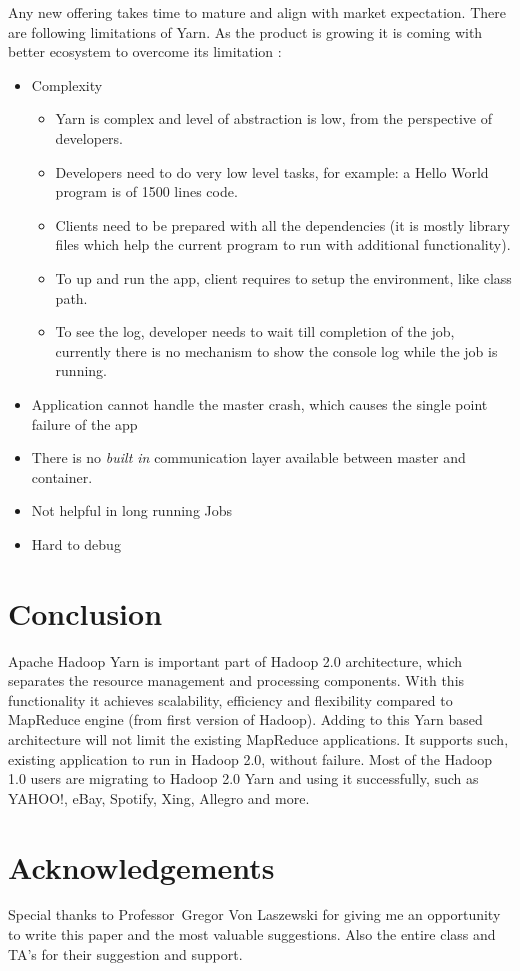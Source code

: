 \documentclass[9pt,twocolumn,twoside]{../../styles/osajnl}
\begin{document}
	Any new offering takes time to mature and align with market expectation. There are following limitations of Yarn. As the product is growing it is coming with better ecosystem to overcome its limitation \cite{www-5}:
\begin{itemize}

	\item Complexity
		\begin{itemize}
			\item Yarn is complex and level of abstraction is low, from the perspective of developers.
			\item Developers need to do very low level tasks, for example:  a Hello World program is of 1500 lines code.
			\item Clients need to be prepared with all the dependencies (it is mostly library files which help the current program to run with additional functionality).
			\item To up and run the app, client requires to setup the environment, like class path.
			\item To see the log, developer needs to wait till completion of the job, currently there is no mechanism to show the console log while the job is running.
		\end{itemize}


	\item Application cannot handle the master crash, which causes the single point failure of the app
	\item There is no \textit{built in} communication layer available between master and container.
	\item Not helpful in long running Jobs
	\item Hard to debug

\end{itemize}

\section{Conclusion}

Apache Hadoop Yarn is important part of Hadoop 2.0 architecture, which separates the resource management and processing components. With this functionality it achieves scalability, efficiency and flexibility compared to MapReduce engine (from first version of Hadoop). Adding to this Yarn based architecture will not limit the existing MapReduce applications. It supports such, existing application to run in Hadoop 2.0, without failure. Most of the Hadoop 1.0 users are migrating to Hadoop 2.0 Yarn and using it successfully, such as YAHOO!, eBay, Spotify, Xing, Allegro and more.
\section*{Acknowledgements}

Special thanks to Professor Gregor Von Laszewski for giving me an opportunity to write this paper and the most valuable suggestions. Also the entire class and TA’s for their suggestion and support.



\end{document}
